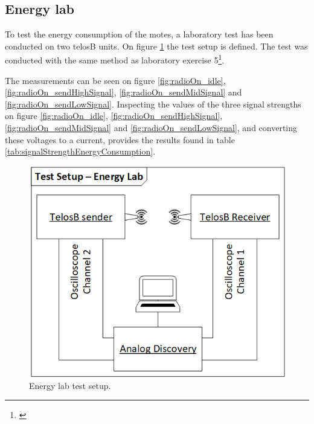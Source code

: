\subsection{Energy lab}\label{sc:energylab}

To test the energy consumption of the motes, a laboratory test has been conducted on two telosB units. On figure \ref{fig:energyLab_testSetup} the test setup is defined. The test was conducted with the same method as laboratory exercise 5\footnote{\cite{Madsen}}.

\noindent The measurements can be seen on figure \ref{fig:radioOn_idle}, \ref{fig:radioOn_sendHighSignal}, \ref{fig:radioOn_sendMidSignal} and \ref{fig:radioOn_sendLowSignal}. Inspecting the values of the three signal strengths on figure \ref{fig:radioOn_idle}, \ref{fig:radioOn_sendHighSignal}, \ref{fig:radioOn_sendMidSignal} and \ref{fig:radioOn_sendLowSignal}, and converting these voltages to a current, provides the results found in table \ref{tab:signalStrengthEnergyConsumption}.

\begin{figure}[H]
	\centering
	\includegraphics[width=1\linewidth]{implementation/energylab/fig/energyLab_testSetup.png}
	\caption{Energy lab test setup.}
	\label{fig:energyLab_testSetup}
\end{figure}


